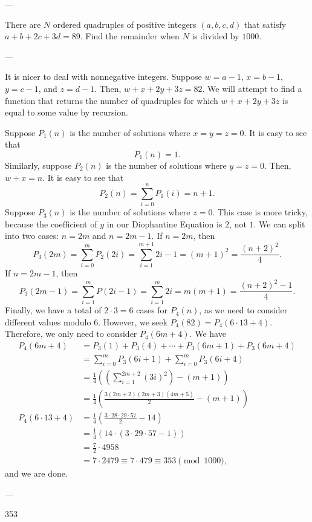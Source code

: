 
---

There are $N$ ordered quadruples of positive integers $(a,b,c,d)$ that satisfy $a+b+2c+3d=89$. Find the remainder when $N$ is divided by $1000$. 

---

It is nicer to deal with nonnegative integers. Suppose $w=a-1$, $x=b-1$, $y=c-1$, and $z=d-1$. Then, $w+x+2y+3z=82$. We will attempt to find a function that returns the number of quadruples for which $w+x+2y+3z$ is equal to some value by recursion.

Suppose $P_1(n)$ is the number of solutions where $x=y=z=0$. It is easy to see that \[P_1(n)=1.\]
Similarly, suppose $P_2(n)$ is the number of solutions where $y=z=0$. Then, $w+x=n$. It is easy to see that \[P_2(n)=\sum_{i=0}^n P_1(i)=n+1.\]
Suppose $P_3(n)$ is the number of solutions where $z=0$. This case is more tricky, because the coefficient of $y$ in our Diophantine Equation is $2$, not $1$. We can split into two cases: $n=2m$ and $n=2m-1$. If $n=2m$, then \[P_3(2m)=\sum_{i=0}^m P_2(2i)=\sum_{i=1}^{m+1} 2i-1=(m+1)^2=\frac{(n+2)^2}{4}.\]
If $n=2m-1$, then \[P_3(2m-1)=\sum_{i=1}^m P(2i-1)=\sum_{i=1}^m 2i=m(m+1)=\frac{(n+2)^2-1}{4}.\]
Finally, we have a total of $2\cdot 3=6$ cases for $P_4(n)$, as we need to consider different values modulo $6$. However, we seek $P_4(82)=P_4(6\cdot 13+4)$. Therefore, we only need to consider $P_4(6m+4)$. We have
\begin{align*}
    P_4(6m+4)&=P_3(1)+P_3(4)+\cdots+P_3(6m+1)+P_3(6m+4)\\
    &=\sum_{i=0}^m P_3(6i+1)+\sum_{i=0}^m P_3(6i+4)\\
    &=\frac{1}{4}\left(\left(\sum_{i=1}^{2m+2} (3i)^2\right)-(m+1)\right)\\
    &=\frac{1}{4}\left(\frac{3(2m+2)(2m+3)(4m+5)}{2}-(m+1)\right)\\
    P_4(6\cdot 13+4)&=\frac{1}{4}\left(\frac{3\cdot 28\cdot 29\cdot 57}{2}-14\right)\\
    &=\frac{1}{4}\left(14\cdot (3\cdot 29\cdot 57-1)\right)\\
    &=\frac{7}{2}\cdot 4958\\
    &=7\cdot 2479\equiv 7\cdot 479\equiv 353\pmod{1000},
\end{align*}
and we are done.

---

353
